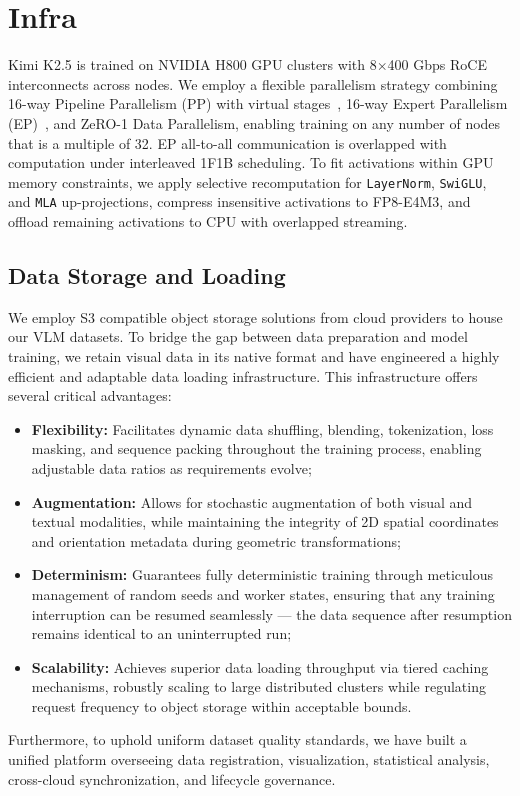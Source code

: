 \section{Infra}
Kimi K2.5 is trained on NVIDIA H800 GPU clusters with 8$\times$400 Gbps RoCE interconnects across nodes. We employ a flexible parallelism strategy combining 16-way Pipeline Parallelism (PP) with virtual stages~\citep{huang2019gpipeefficienttraininggiant,narayanan2021efficientlargescalelanguagemodel}, 16-way Expert Parallelism (EP)~\citep{lepikhin2020gshard}, and ZeRO-1 Data Parallelism, enabling training on any number of nodes that is a multiple of 32. EP all-to-all communication is overlapped with computation under interleaved 1F1B scheduling. To fit activations within GPU memory constraints, we apply selective recomputation for \texttt{LayerNorm}, \texttt{SwiGLU}, and \texttt{MLA} up-projections, compress insensitive activations to FP8-E4M3, and offload remaining activations to CPU with overlapped streaming.

\subsection{Data Storage and Loading}
We employ S3 \citep{amazon_s3} compatible object storage solutions from cloud providers to house our VLM datasets.
To bridge the gap between data preparation and model training, we retain visual data in its native format and have engineered a highly efficient and adaptable data loading infrastructure.
This infrastructure offers several critical advantages:
\begin{itemize}
\item \textbf{Flexibility:} Facilitates dynamic data shuffling, blending, tokenization, loss masking, and sequence packing throughout the training process, enabling adjustable data ratios as requirements evolve;
\item \textbf{Augmentation:} Allows for stochastic augmentation of both visual and textual modalities, while maintaining the integrity of 2D spatial coordinates and orientation metadata during geometric transformations;
\item \textbf{Determinism:} Guarantees fully deterministic training through meticulous management of random seeds and worker states, ensuring that any training interruption can be resumed seamlessly --- the data sequence after resumption remains identical to an uninterrupted run;
\item \textbf{Scalability:} Achieves superior data loading throughput via tiered caching mechanisms, robustly scaling to large distributed clusters while regulating request frequency to object storage within acceptable bounds.
\end{itemize}
Furthermore, to uphold uniform dataset quality standards, we have built a unified platform overseeing data registration, visualization, statistical analysis, cross-cloud synchronization, and lifecycle governance.